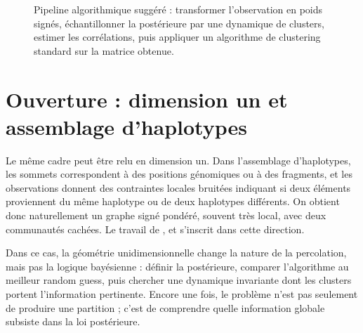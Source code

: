 \begin{figure}[H]
\centering
{}
\caption{Pipeline algorithmique suggéré : transformer l'observation en poids signés, échantillonner la postérieure par une dynamique de clusters, estimer les corrélations, puis appliquer un algorithme de clustering standard sur la matrice obtenue.}
\label{fig:chapII_pipeline_algo}
\end{figure}

\section{Ouverture : dimension un et assemblage d'haplotypes}
\label{sec:chapII_haplotypes}

Le même cadre peut être relu en dimension un. Dans l'assemblage d'haplotypes, les sommets correspondent à des positions génomiques ou à des fragments, et les observations donnent des contraintes locales bruitées indiquant si deux éléments proviennent du même haplotype ou de deux haplotypes différents. On obtient donc naturellement un graphe signé pondéré, souvent très local, avec deux communautés cachées. Le travail de ,  et  \cite{SankararamanVikaloBaccelli2020} s'inscrit dans cette direction.

Dans ce cas, la géométrie unidimensionnelle change la nature de la percolation, mais pas la logique bayésienne : définir la postérieure, comparer l'algorithme au meilleur random guess, puis chercher une dynamique invariante dont les clusters portent l'information pertinente. Encore une fois, le problème n'est pas seulement de produire une partition ; c'est de comprendre quelle information globale subsiste dans la loi postérieure.


